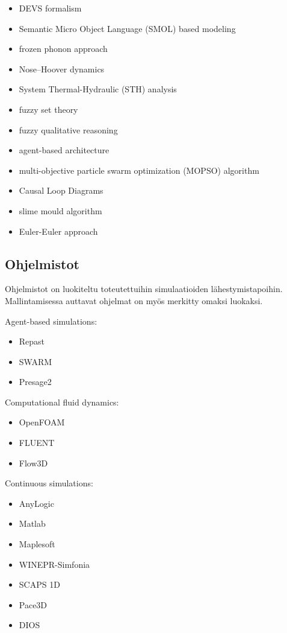 \documentclass[utf8]{gradu3}
\begin{document}
\begin{itemize}
    \item DEVS formalism 
    \item Semantic Micro Object Language (SMOL) based modeling 
    \item frozen phonon approach 
    \item Nose–Hoover dynamics 
    \item System Thermal-Hydraulic (STH) analysis 
    \item fuzzy set theory 
    \item fuzzy qualitative reasoning 
    \item agent-based architecture 
    \item multi-objective particle swarm optimization (MOPSO) algorithm 
    \item Causal Loop Diagrams 
    \item slime mould algorithm 
    \item Euler-Euler approach
\end{itemize}


\subsection{Ohjelmistot}
Ohjelmistot on luokiteltu toteutettuihin simulaatioiden lähestymistapoihin. Mallintamisessa auttavat ohjelmat on myös merkitty omaksi luokaksi.

Agent-based simulations:
\begin{itemize}
    \item Repast
    \item SWARM
    \item Presage2
\end{itemize}

Computational fluid dynamics:
\begin{itemize}
    \item OpenFOAM
    \item FLUENT
    \item Flow3D
\end{itemize}

Continuous simulations:
\begin{itemize}
    \item AnyLogic
    \item Matlab
    \item Maplesoft
    \item WINEPR-Simfonia
    \item SCAPS 1D
    \item Pace3D
    \item DIOS
\end{itemize}
\end{document}
